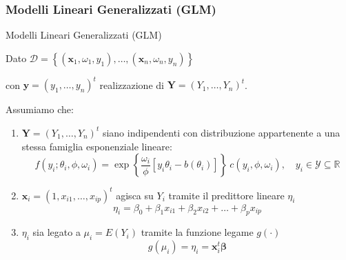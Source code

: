 \documentclass[pdf, aspectratio=169]{beamer}\usepackage[]{graphicx}\usepackage[]{color}
\theoremstyle{definition}
\begin{document}
\begin{frame}
\frametitle{Modelli Lineari Generalizzati (GLM)}
\fontsize{9pt}{11pt}\selectfont


\begin{block}{Modelli Lineari Generalizzati (GLM)}
  
  Dato $\mathcal{D} = \left\{ (\boldsymbol{x}_1, \omega_1, y_1), \dots,  (\boldsymbol{x}_n, \omega_n, y_n) \right\}$
  
  con $\boldsymbol{y} = (y_1, \dots, y_n)^t$ realizzazione di $\boldsymbol{Y} = (Y_1, \dots, Y_n)^t$.
  
  \vspace{0.2cm}
  Assumiamo che:
  \begin{enumerate}
    \item $\boldsymbol{Y} = (Y_1, \dots, Y_n)^t$ siano indipendenti con distribuzione appartenente a una stessa famiglia esponenziale lineare:
    $$f(y_i; \theta_i, \phi, \omega_i) = \exp{\left\{ \frac{\omega_i}{\phi} \left[y_i\theta_i - b(\theta_i) \right] \right\}} \ c(y_i, \phi, \omega_i), \quad y_i\in \mathcal{Y}\subseteq\mathbb{R}$$
    \item $\boldsymbol{x}_i = \left(1, x_{i1}, \dots, x_{ip} \right)^t$ agisca su $Y_i$ tramite il predittore lineare $\eta_i$
    $$\eta_i = \beta_0 + \beta_1 x_{i1} + \beta_2 x_{i2} + \dots + \beta_p x_{ip}$$
    \item $\eta_i$ sia legato a $\mu_i=E(Y_i)$ tramite la funzione legame $g(\cdot)$
    $$g(\mu_i) = \eta_i = \boldsymbol{x}_i^t \boldsymbol{\beta}$$
  \end{enumerate}
\end{block}

\end{frame}
\end{document}
